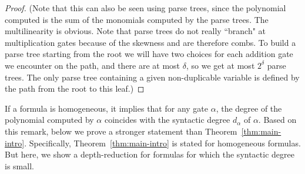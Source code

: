 \documentclass[10pt,a4paper]{article}
\begin{document}
\begin{proof}
	(Note that this can also be seen using parse trees, since the polynomial computed is the sum of the monomials computed by the parse trees. The multilinearity is obvious. Note that parse trees do not really ``branch" at multiplication gates because of the skewness and are therefore combs.  To build a parse tree starting from the root we will have two choices for each addition gate we encounter on the path, and there are at most $\delta$, so we get at most $2^\delta$ parse trees. The only parse tree containing a given non-duplicable variable is defined by the path from the root to this leaf.)
\end{proof}

If a formula is homogeneous, it implies that for any gate \(\alpha\), the degree of the polynomial computed by \(\alpha\) coincides with the syntactic degree \(d_{\alpha}\) of \(\alpha\). Based on this remark, below we prove a stronger statement than Theorem~\ref{thm:main-intro}. Specifically, Theorem~\ref{thm:main-intro} is stated for homogeneous formulas. But here, we show a depth-reduction for formulas for which the syntactic degree is small. 
\end{document}
